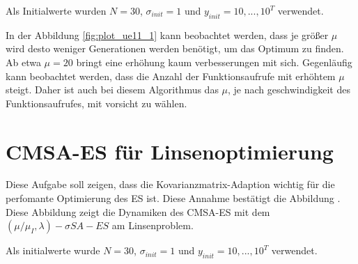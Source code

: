 Als Initialwerte wurden $N=30$, $\sigma_{init}=1$ und $y_{init}={10,...,10}^T$ verwendet.


In der Abbildung \ref{fig:plot_ue11_1} kann beobachtet werden, dass je größer $\mu$ wird desto weniger Generationen werden benötigt, um das Optimum zu finden. Ab etwa $\mu = 20$ bringt eine erhöhung kaum verbesserungen mit sich. Gegenläufig kann beobachtet werden, dass die Anzahl der Funktionsaufrufe mit erhöhtem $\mu$ steigt. Daher ist auch bei diesem Algorithmus das $\mu$, je nach geschwindigkeit des Funktionsaufrufes, mit vorsicht zu wählen.

\chapter{CMSA-ES für Linsenoptimierung}

Diese Aufgabe soll zeigen, dass die Kovarianzmatrix-Adaption wichtig für die perfomante Optimierung des ES ist. Diese Annahme bestätigt die Abbildung . Diese Abbildung zeigt die Dynamiken des CMSA-ES mit dem $(\mu/\mu_I,\lambda)-\sigma SA-ES$ am Linsenproblem.

Als initialwerte wurde $N=30$, $\sigma_{init}=1$ und $y_{init}={10,...,10}^T$ verwendet.







